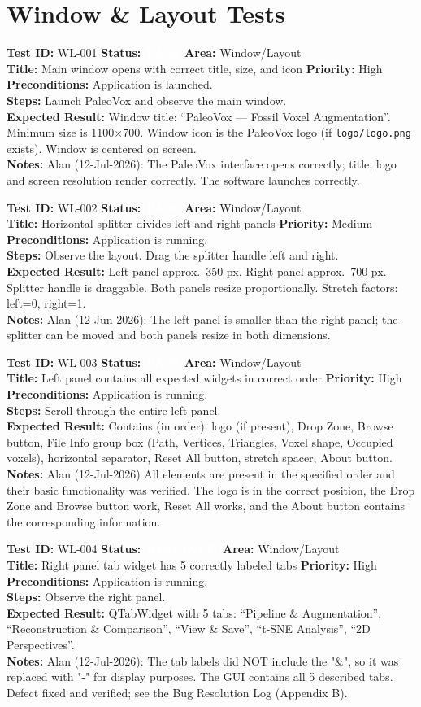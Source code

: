 \documentclass[12pt,a4paper]{article}
\newcommand{\statuspass}{\colorbox{statusgreen}{\textcolor{white}{\textbf{\,PASS\,}}}}
\newcommand{\statusresolved}{\colorbox{statusorange}{\textcolor{white}{\textbf{\,RESOLVED\,}}}}
\newcommand{\testcase}[9]{%
  \smallskip
  \noindent\textbf{Test ID:} #1 \hfill \textbf{Status:} #2 \hfill \textbf{Area:} #3 \\
  \textbf{Title:} #4 \hfill \textbf{Priority:} #5 \\[0.3em]
  \textbf{Preconditions:} #6 \\[0.3em]
  \textbf{Steps:} #7 \\[0.3em]
  \textbf{Expected Result:} #8 \\
  \textbf{Notes:} #9
  \smallskip
}
\begin{document}
\section{Window \& Layout Tests}

\testcase{WL-001}{\statuspass}{Window/Layout}{Main window opens with correct title, size, and icon}{High}{Application is launched.}{Launch PaleoVox and observe the main window.}{Window title: ``PaleoVox --- Fossil Voxel Augmentation''. Minimum size is 1100$\times$700. Window icon is the PaleoVox logo (if \texttt{logo/logo.png} exists). Window is centered on screen.}{Alan (12-Jul-2026): The PaleoVox interface opens correctly; title, logo and screen resolution render correctly. The software launches correctly.}


\testcase{WL-002}{\statuspass}{Window/Layout}{Horizontal splitter divides left and right panels}{Medium}{Application is running.}{Observe the layout. Drag the splitter handle left and right.}{Left panel approx.\ 350 px. Right panel approx.\ 700 px. Splitter handle is draggable. Both panels resize proportionally. Stretch factors: left=0, right=1.}{Alan (12-Jun-2026): The left panel is smaller than the right panel; the splitter can be moved and both panels resize in both dimensions.}


\testcase{WL-003}{\statuspass}{Window/Layout}{Left panel contains all expected widgets in correct order}{High}{Application is running.}{Scroll through the entire left panel.}{Contains (in order): logo (if present), Drop Zone, Browse button, File Info group box (Path, Vertices, Triangles, Voxel shape, Occupied voxels), horizontal separator, Reset All button, stretch spacer, About button.}{Alan (12-Jul-2026) All elements are present in the specified order and their basic functionality was verified. The logo is in the correct position, the Drop Zone and Browse button work, Reset All works, and the About button contains the corresponding information.}


\testcase{WL-004}{\statusresolved}{Window/Layout}{Right panel tab widget has 5 correctly labeled tabs}{High}{Application is running.}{Observe the right panel.}{QTabWidget with 5 tabs: ``Pipeline \& Augmentation'', ``Reconstruction \& Comparison'', ``View \& Save'', ``t-SNE Analysis'', ``2D Perspectives''.}{Alan (12-Jul-2026): The tab labels did NOT include the "\&", so it was replaced with "-" for display purposes. The GUI contains all 5 described tabs. Defect fixed and verified; see the Bug Resolution Log (Appendix B).}
\end{document}
